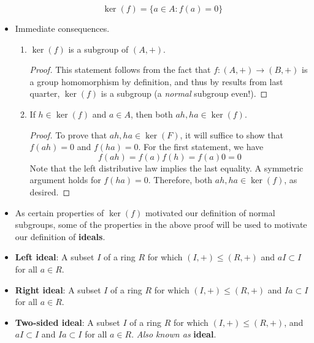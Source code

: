 \documentclass[../notes.tex]{subfiles}
\begin{document}
\begin{itemize}
    \begin{equation*}
        \ker(f) = \{a\in A:f(a)=0\}
    \end{equation*}
    \item Immediate consequences.
    \begin{enumerate}[label={(\roman*)}]
        \item $\ker(f)$ is a subgroup of $(A,+)$.
        \begin{proof}
            This statement follows from the fact that $f:(A,+)\to(B,+)$ is a group homomorphism by definition, and thus by results from last quarter, $\ker(f)$ is a subgroup (a \emph{normal} subgroup even!).
        \end{proof}
        \item If $h\in\ker(f)$ and $a\in A$, then both $ah,ha\in\ker(f)$.
        \begin{proof}
            To prove that $ah,ha\in\ker(F)$, it will suffice to show that $f(ah)=0$ and $f(ha)=0$. For the first statement, we have
            \begin{equation*}
                f(ah) = f(a)f(h)
                = f(a)0
                = 0
            \end{equation*}
            Note that the left distributive law implies the last equality. A symmetric argument holds for $f(ha)=0$. Therefore, both $ah,ha\in\ker(f)$, as desired.
        \end{proof}
    \end{enumerate}
    \item As certain properties of $\ker(f)$ motivated our definition of normal subgroups, some of the properties in the above proof will be used to motivate our definition of \textbf{ideals}.
    \item \textbf{Left ideal}: A subset $I$ of a ring $R$ for which $(I,+)\leq(R,+)$ and $aI\subset I$ for all $a\in R$.
    \item \textbf{Right ideal}: A subset $I$ of a ring $R$ for which $(I,+)\leq(R,+)$ and $Ia\subset I$ for all $a\in R$.
    \item \textbf{Two-sided ideal}: A subset $I$ of a ring $R$ for which $(I,+)\leq(R,+)$, and $aI\subset I$ and $Ia\subset I$ for all $a\in R$. \emph{Also known as} \textbf{ideal}.
    \begin{itemize}

\end{itemize}
\end{itemize}
\end{document}
